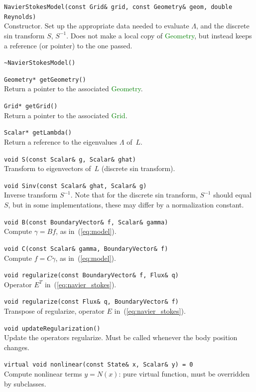 \documentclass[11pt]{article}
\def\class#1{\textcolor{green}{\ttfamily\small #1}} %
\def\fn#1{{\ttfamily\small #1}} %
\let\code\lstinline
\begin{document}
\begin{description}
	\item \code|NavierStokesModel(const Grid& grid, const Geometry& geom, double Reynolds)|\\
		Constructor.  Set up the appropriate data needed to evaluate $\Lambda$, and the discrete sin transform $S$, $S^{-1}$.  Does not make a local copy of \class{Geometry}, but instead keeps a reference (or pointer) to the one passed.
	\item \code|~NavierStokesModel()|\\
	\item \code|Geometry* getGeometry()|\\
		Return a pointer to the associated \class{Geometry}.
	\item \code|Grid* getGrid()|\\
		Return a pointer to the associated \class{Grid}.
	\item \code|Scalar* getLambda()|\\
		Return a reference to the eigenvalues $\Lambda$ of~$L$.
	\item \code|void S(const Scalar& g, Scalar& ghat)|\\
		Transform to eigenvectors of~$L$ (discrete sin transform).
	\item \code|void Sinv(const Scalar& ghat, Scalar& g)|\\
		Inverse transform $S^{-1}$.  Note that for the discrete sin transform, $S^{-1}$ should equal~$S$, but in some implementations, these may differ by a normalization constant.
	\item \code|void B(const BoundaryVector& f, Scalar& gamma)|\\
		Compute $\gamma = Bf$, as in~(\ref{eq:model}).
	\item \code|void C(const Scalar& gamma, BoundaryVector& f)|\\
		Compute $f = C\gamma$, as in~(\ref{eq:model}).
	\item \code|void regularize(const BoundaryVector& f, Flux& q)|\\
		Operator $E^T$ in~(\ref{eq:navier_stokes}).
	\item \code|void regularize(const Flux& q, BoundaryVector& f)|\\
		Transpose of regularize, operator $E$ in~(\ref{eq:navier_stokes}).
	\item \code|void updateRegularization()|\\
		Update the operators \fn{regularize}.  Must be called whenever the body position changes.
	\item \code|virtual void nonlinear(const State& x, Scalar& y) = 0|\\
		Compute nonlinear terms $y = N(x)$: pure virtual function, must be overridden by subclasses.
\end{description}
\end{document}
